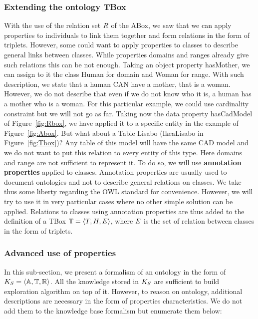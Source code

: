 \subsubsection{Extending the ontology TBox}

With the use of the relation set $R$ of the ABox, we saw that we can apply properties to individuals to link them together and form relations in the form of triplets. However, some could want to apply properties to classes to describe general links between classes. While properties domains and ranges already give such relations this can be not enough. Taking an object property hasMother, we can assign to it the class Human for domain and Woman for range. With such description, we state that a human CAN have a mother, that is a woman. However, we do not describe that even if we do not know who it is, a human has a mother who is a woman. For this particular example, we could use cardinality constraint but we will not go as far. Taking now the data property hasCadModel of Figure~\ref{fig:Rbox}, we have applied it to a specific entity in the example of Figure~\ref{fig:Abox}. But what about a Table Lisabo (IkeaLisabo in Figure~\ref{fig:Tbox})? Any table of this model will have the same CAD model and we do not want to put this relation to every entity of this type. Here domains and range are not sufficient to represent it. To do so, we will use \textbf{annotation properties} applied to classes. Annotation properties are usually used to document ontologies and not to describe general relations on classes. We take thus some liberty regarding the OWL standard for convenience. However, we will try to use it in very particular cases where no other simple solution can be applied. Relations to classes using annotation properties are thus added to the definition of a TBox $\mathbb{T} = \langle T, H, E \rangle$, where $E$ is the set of relation between classes in the form of triplets.

\subsubsection{Advanced use of properties}

In this sub-section, we present a formalism of an ontology in the form of $K_S = \langle \mathbb{A}, \mathbb{T}, \mathbb{R} \rangle$. All the knowledge stored in $K_S$ are sufficient to build exploration algorithm on top of it. However, to reason on ontology, additional descriptions are necessary in the form of properties characteristics. We do not add them to the knowledge base formalism but enumerate them below: 

